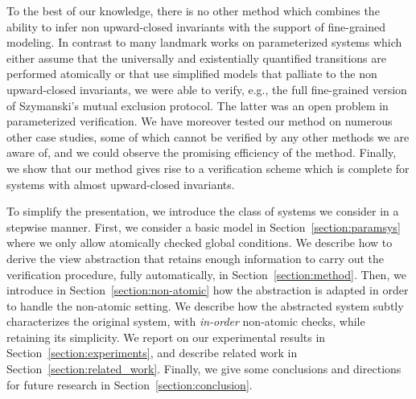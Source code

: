 To the best of our knowledge, there is no other method which combines
the ability to infer non upward-closed invariants with the support of
fine-grained modeling.
%
In contrast to many landmark works on parameterized systems
\cite{CTV06,PRZ-tacas01,BHV04,AJNO:simple,APRXZ01,Namjoshi:VMCAI07,rmc:wo:transducers}
which either assume that the universally and existentially quantified
transitions are performed atomically or that use simplified models
that palliate to the non upward-closed invariants, %
we were able to verify, e.g., the full fine-grained version of
Szymanski's mutual exclusion protocol. %
The latter was an open problem in parameterized verification. %
%
We have moreover tested our method on numerous other case studies,
some of which cannot be verified by any other methods we are aware of,
and we could observe the promising efficiency of the method.
%
Finally, we show that our method gives rise to a verification scheme
which is complete for systems with almost upward-closed invariants.

To simplify the presentation, we introduce the class of systems we
consider in a stepwise manner. First, we consider a basic model in
Section~\ref{section:paramsys} where we only allow atomically checked
global conditions. We describe how to derive the view abstraction that
retains enough information to carry out the verification procedure,
fully automatically, in Section~\ref{section:method}.
%
Then, we introduce in Section~\ref{section:non-atomic} how the
abstraction is adapted in order to handle the non-atomic setting. We
describe how the abstracted system subtly characterizes the original
system, with \emph{in-order} non-atomic checks, while retaining its
simplicity.
%
We report on our experimental results in
Section~\ref{section:experiments}, and describe related work in
Section~\ref{section:related_work}. Finally, we give some conclusions
and directions for future research in
Section~\ref{section:conclusion}.
